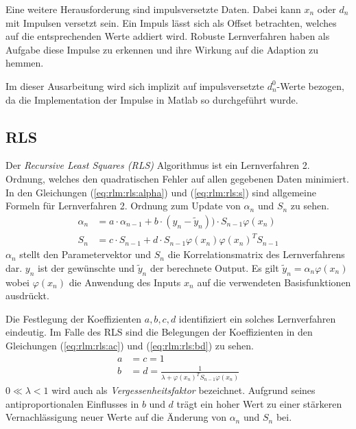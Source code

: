 \documentclass[a4paper, 12pt]{article}
\begin{document}
Eine weitere Herausforderung sind impulsversetzte Daten. Dabei kann $x_n$ oder $d_n$ mit Impulsen versetzt sein. Ein Impuls lässt sich als Offset betrachten, welches auf die entsprechenden Werte addiert wird.
Robuste Lernverfahren haben als Aufgabe diese Impulse zu erkennen und ihre Wirkung auf die Adaption zu hemmen. 

Im dieser Ausarbeitung wird sich implizit auf impulsversetzte $d_n^0$-Werte bezogen, da die Implementation der Impulse in Matlab so durchgeführt wurde.

\subsection{RLS}
\label{sec:rlm:rls}
Der \emph{Recursive Least Squares (RLS)} Algorithmus \cite[p.~195ff]{diniz1997adaptive} ist ein Lernverfahren 2. Ordnung, welches den quadratischen Fehler auf allen gegebenen Daten minimiert.
In den Gleichungen (\ref{eq:rlm:rls:alpha}) und (\ref{eq:rlm:rls:s}) sind allgemeine Formeln für Lernverfahren 2. Ordnung zum Update von $\alpha_n$ und $S_n$ zu sehen.
\begin{align}
    \label{eq:rlm:rls:alpha}
	\alpha_n &= a \cdot \alpha_{n-1} + b\cdot(y_n-\tilde{y}_n)) \cdot S_{n-1} \varphi(x_n)\\
    \label{eq:rlm:rls:s}
	S_{n} &= c \cdot S_{n-1} + d \cdot S_{n-1} \varphi(x_n) \varphi(x_n)^T S_{n-1}
\end{align}
$\alpha_n$ stellt den Parametervektor und $S_n$ die Korrelationsmatrix des Lernverfahrens dar. $y_n$ ist der gewünschte und $\tilde{y}_n$ der berechnete Output. Es gilt $\tilde{y}_n = \alpha_n \varphi(x_n)$ wobei $\varphi(x_n)$ die Anwendung des Inputs $x_n$ auf die verwendeten Basisfunktionen ausdrückt.

Die Festlegung der Koeffizienten $a, b, c, d$ identifiziert ein solches Lernverfahren eindeutig. 
Im Falle des RLS sind die Belegungen der Koeffizienten in den Gleichungen (\ref{eq:rlm:rls:ac}) und (\ref{eq:rlm:rls:bd}) zu sehen.
\begin{align}
    \label{eq:rlm:rls:ac}
	a &= c=1\\
    \label{eq:rlm:rls:bd}
	b&=d=\frac{1}{\lambda+\varphi(x_n)^T S_{n-1} \varphi(x_n)}
\end{align}
$0 \ll \lambda<1$ wird auch als \emph{Vergessenheitsfaktor} bezeichnet. Aufgrund seines antiproportionalen Einflusses in $b$ und $d$ trägt ein hoher Wert zu einer stärkeren Vernachlässigung neuer Werte auf die Änderung von $\alpha_n$ und $S_n$ bei.
\end{document}
